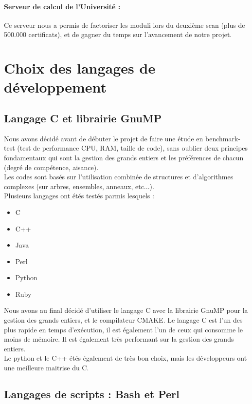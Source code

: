 \paragraph{Serveur de calcul de l'Université :} Ce serveur nous a permis de factoriser les moduli lors du deuxième scan (plus de 500.000 certificats), et de gagner du temps sur l'avancement de notre projet.

\section{Choix des langages de développement}

\subsection{Langage C et librairie GnuMP}

Nous avons décidé avant de débuter le projet de faire une étude en benchmark-test \cite{chooseprogram2013} \cite{marceau2009program} \cite{udemypng} (test de performance CPU, RAM, taille de code), sans oublier deux principes fondamentaux qui sont la gestion des grands entiers et les préférences de chacun (degré de compétence, aisance).\\
Les codes sont basés sur l'utilisation combinée de structures et d'algorithmes complexes (sur arbres, ensembles, anneaux, etc...).\\

Plusieurs langages ont étés testés parmis lesquels :
\begin{itemize}
\item C
\item C++
\item Java
\item Perl
\item Python
\item Ruby
\end{itemize}

Nous avons au final décidé d'utiliser le langage C avec la librairie GnuMP \cite{gmplib} pour la gestion des grands entiers, et le compilateur CMAKE.
Le langage C est l'un des plus rapide en temps d'exécution, il est également l'un de ceux qui consomme le moins de mémoire. Il est également très performant sur la gestion des grands entiers.\\
Le python et le C++ étés également de très bon choix, mais les développeurs ont une meilleure maitrise du C.

\subsection{Langages de scripts : Bash et Perl}

